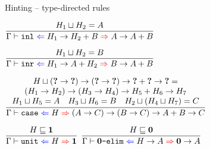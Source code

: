 \documentclass{beamer}
\begin{document}
\begin{frame}{Hinting -- type-directed rules}

\begin{center}
  $\infrule{\sidecond{\hintlub{H_1}{H_2} = A}}{\hinting{\inlfun}{\Fun{H_1}{\Sum{H_2}{B}}}{\Fun{A}{\Sum{A}{B}}}}$

  \vspace{2em}

  $\infrule{\sidecond{\hintlub{H_1}{H_2} = B}}{\hinting{\inrfun}{\Fun{H_1}{\Sum{A}{H_2}}}{\Fun{B}{\Sum{A}{B}}}}$

  \vspace{2em}

  $\infrule{\begin{array}{c} \sidecond{\hintlub{H}{\Fun{(\Fun{\Hole}{\Hole})}{\Fun{(\Fun{\Hole}{\Hole})}{\Fun{\Sum{\Hole}{\Hole}}{\Hole}}}} = \\ \Fun{(\Fun{H_1}{H_2})}{\Fun{(\Fun{H_3}{H_4})}{\Fun{\Sum{H_5}{H_6}}{H_7}}}} \\ \sidecond{\hintlub{H_1}{H_5} = A} \quad \sidecond{\hintlub{H_3}{H_6} = B} \quad \sidecond{\hintlub{H_2}{(\hintlub{H_4}{H_7})} = C} \end{array}}{\hinting{\casefun}{H}{{\Fun{(\Fun{A}{C})}{\Fun{(\Fun{B}{C})}{\Fun{\Sum{A}{B}}{C}}}}}}$

  \vspace{2em}

  $\infrule{\sidecond{\hintorder{H}{\Unit}}}{\hinting{\unit}{H}{\Unit}}$ \quad
  $\infrule{\sidecond{\hintorder{H}{\Empty}}}{\hinting{\emptyelimfun}{\Fun{H}{A}}{\Fun{\Empty}{A}}}$
\end{center}

\end{frame}
\end{document}
